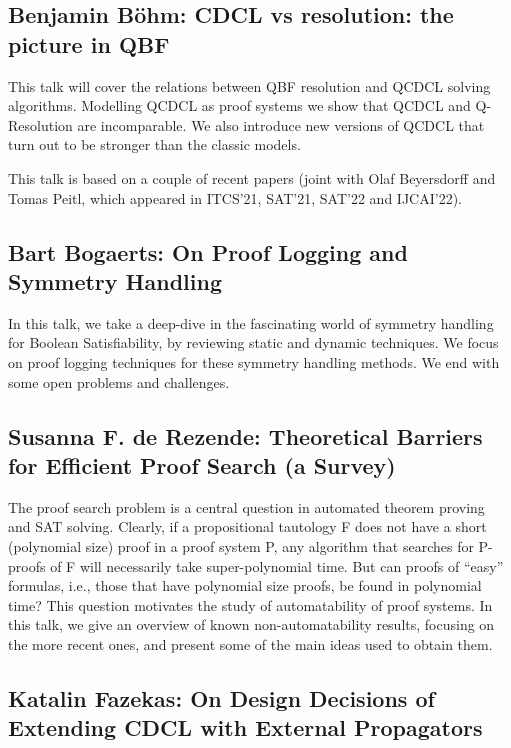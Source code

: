 \documentclass[11pt]{article}
\begin{document}
\subsection*{Benjamin Böhm: CDCL vs resolution: the picture in QBF}\label{Bohm}

This talk will cover the relations between QBF resolution and QCDCL solving algorithms. Modelling QCDCL as proof systems we show that QCDCL and Q-Resolution are incomparable. We also introduce new versions of QCDCL that turn out to be stronger than the classic models.

This talk is based on a couple of recent papers (joint with Olaf Beyersdorff and Tomas Peitl, which appeared in ITCS'21, SAT'21, SAT'22 and IJCAI'22).


\subsection*{Bart Bogaerts: On Proof Logging and Symmetry Handling}\label{Bogaerts}

In this talk, we take a deep-dive in the fascinating world of symmetry handling for Boolean Satisfiability, by reviewing static and dynamic techniques.  We focus on proof logging techniques for these symmetry handling methods. We end with some open problems and challenges.


\subsection*{Susanna F. de Rezende: Theoretical Barriers for Efficient Proof Search (a Survey)}\label{Rezende}

The proof search problem is a central question in automated theorem proving and SAT solving. Clearly, if a propositional tautology F does not have a short (polynomial size) proof in a proof system P, any algorithm that searches for P-proofs of F will necessarily take super-polynomial time. But can proofs of ``easy'' formulas, i.e., those that have polynomial size proofs, be found in polynomial time? This question motivates the study of automatability of proof systems. In this talk, we give an overview of known non-automatability results, focusing on the more recent ones, and present some of the main ideas used to obtain them.


\subsection*{Katalin Fazekas: On Design Decisions of Extending CDCL with External Propagators}\label{Fazekas}
\end{document}
